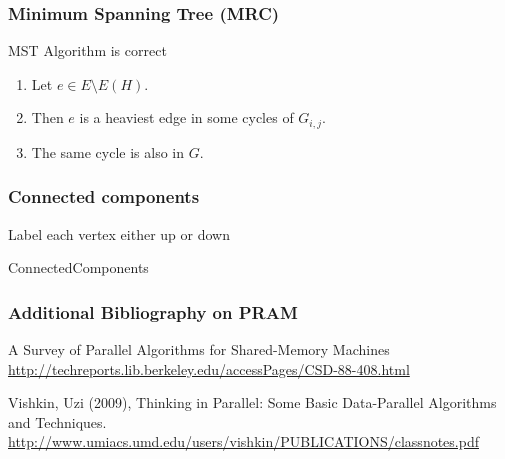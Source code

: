 \documentclass[14pt]{beamer}
\begin{document}
\begin{frame}\frametitle{Minimum Spanning Tree (MRC)}
  \begin{block}{MST Algorithm is correct}
    \begin{enumerate}
      \item
    Let $e\in E\setminus E(H)$.
      \item
    Then $e$ is a heaviest edge in some cycles of $G_{i,j}$.
      \item
    The same cycle is also in $G$.
  \end{enumerate}
\end{block}
\end{frame}


\begin{frame}\frametitle{Connected components}
  \begin{algorithm}[H]
    Label each vertex either \alert{up} or \alert{down}\;
    \caption{ConnectedComponents}
  \end{algorithm}
\end{frame}

\begin{frame}\frametitle{Additional Bibliography on PRAM}

\begin{references}
A Survey of Parallel Algorithms for Shared-Memory Machines
\url{http://techreports.lib.berkeley.edu/accessPages/CSD-88-408.html}
\end{references}

\begin{references}
Vishkin, Uzi (2009), Thinking in Parallel: Some Basic Data-Parallel Algorithms and
Techniques.    
\url{http://www.umiacs.umd.edu/users/vishkin/PUBLICATIONS/classnotes.pdf}    
\end{references}
\end{frame}
\end{document}
